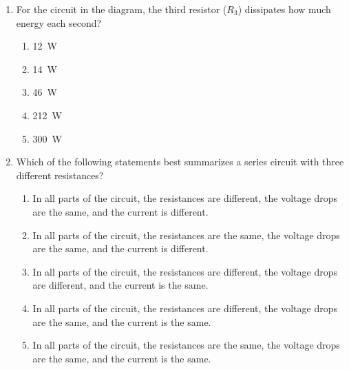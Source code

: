 \documentclass{../../../oss-classkick}
\begin{document}
\begin{multicols*}{2}
\begin{enumerate}[leftmargin=18pt,resume]
  \item For the circuit in the diagram, the third resistor ($R_3$) dissipates
    how much energy each second?
    \begin{enumerate}[nosep,leftmargin=18pt,label=(\Alph*)]
    \item\SI{12}{W}
    \item\SI{14}{W}
    \item\SI{46}{W}
    \item\SI{212}{W}
    \item\SI{300}{W}
    \end{enumerate}
    \label{parallel4}
    \columnbreak

  \item Which of the following statements best summarizes a series circuit
    with three different resistances?
    \begin{enumerate}[nosep,leftmargin=18pt,label=(\Alph*)]
    \item In all parts of the circuit, the resistances are different, the
      voltage drops are the same, and the current is different.
    \item In all parts of the circuit, the resistances are the same, the voltage
      drops are the same, and the current is different.
    \item In all parts of the circuit, the resistances are different, the
      voltage drops are different, and the current is the same.
    \item In all parts of the circuit, the resistances are different, the
      voltage drops are the same, and the current is the same.
    \item In all parts of the circuit, the resistances are the same, the
      voltage drops are the same, and the current is the same.
    \end{enumerate}
    \vspace{.7in}

%


\end{enumerate}
\end{multicols*}
\end{document}
